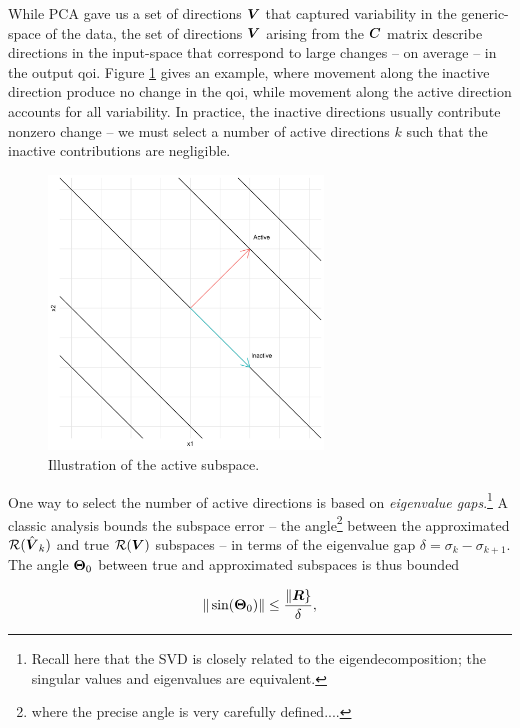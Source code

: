 \documentclass{article}
\begin{document}
While PCA gave us a set of directions $\boldsymbol{V}$ that captured variability in the
generic-space of the data, the set of directions $\boldsymbol{V}$ arising from the $\boldsymbol{C}$
matrix describe directions in the input-space that correspond to large changes
-- on average -- in the output qoi. Figure \ref{fig:as-contour} gives an
example, where movement along the inactive direction produce no change in the
qoi, while movement along the active direction accounts for all variability. In
practice, the inactive directions usually contribute nonzero change -- we must
select a number of active directions $k$ such that the inactive contributions
are negligible.

\begin{figure}[!ht]
  \centering
  \includegraphics[width=0.65\textwidth]{../../images/as_contour1}
  \caption{Illustration of the active subspace.}
  \label{fig:as-contour}
\end{figure}

One way to select the number of active directions is based on \emph{eigenvalue
  gaps}.\footnote{Recall here that the SVD is closely related to the
  eigendecomposition; the singular values and eigenvalues are equivalent.} A
classic analysis bounds the subspace error -- the angle\footnote{where the
  precise angle is very carefully defined....} between the approximated
$\mathcal{R}(\hat{\boldsymbol{V}}_k)$ and true $\mathcal{R}(\boldsymbol{V})$ subspaces -- in terms of the eigenvalue
gap $\delta = \sigma_k - \sigma_{k+1}$.\cite{davis1970rotation} The angle
$\boldsymbol{\Theta}_0$ between true and approximated subspaces is thus bounded

\begin{equation} \label{eq:sine-bound}
  \|\sin(\boldsymbol{\Theta}_0)\| \leq \frac{\|\boldsymbol{R}\}}{\delta},
\end{equation}
\end{document}
